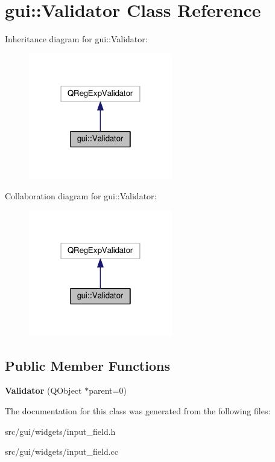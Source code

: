 \hypertarget{classgui_1_1Validator}{}\section{gui\+:\+:Validator Class Reference}
\label{classgui_1_1Validator}


Inheritance diagram for gui\+:\+:Validator\+:\nopagebreak
\begin{figure}[H]
\begin{center}
\leavevmode
\includegraphics[width=178pt]{classgui_1_1Validator__inherit__graph}
\end{center}
\end{figure}


Collaboration diagram for gui\+:\+:Validator\+:\nopagebreak
\begin{figure}[H]
\begin{center}
\leavevmode
\includegraphics[width=178pt]{classgui_1_1Validator__coll__graph}
\end{center}
\end{figure}
\subsection*{Public Member Functions}
\begin{DoxyCompactItemize}
\item 
{\bfseries Validator} (Q\+Object $\ast$parent=0)\hypertarget{classgui_1_1Validator_a9db0b9bf15d5de2250b5133442f3e550}{}\label{classgui_1_1Validator_a9db0b9bf15d5de2250b5133442f3e550}

\end{DoxyCompactItemize}


The documentation for this class was generated from the following files\+:\begin{DoxyCompactItemize}
\item 
src/gui/widgets/input\+\_\+field.\+h\item 
src/gui/widgets/input\+\_\+field.\+cc\end{DoxyCompactItemize}
